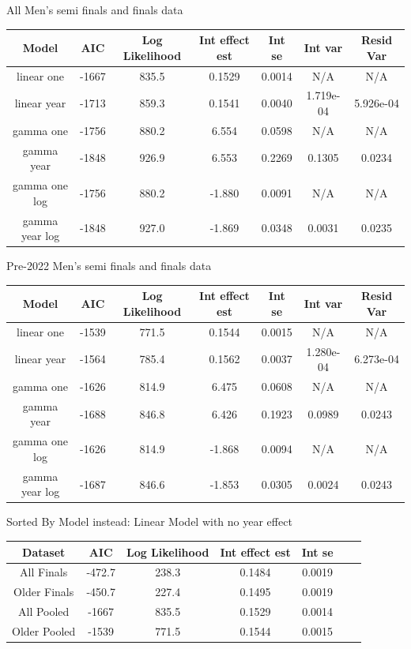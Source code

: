\documentclass[12pt, letterpaper, titlepage]{article}
\begin{document}
All Men's semi finals and finals data
\begin{center}
  \begin{tabular}{|c | c | c | c | c | c | c |} 
   \hline
   Model & AIC & Log Likelihood & Int effect est & Int se & Int var & Resid Var \\ [0.5ex] 
   \hline\hline
   linear one & -1667 & 835.5 & 0.1529 & 0.0014 & N/A & N/A \\
   \hline
   linear year & -1713 & 859.3 & 0.1541 & 0.0040 & 1.719e-04 & 5.926e-04 \\ 
   \hline
   gamma one & -1756 & 880.2 & 6.554 & 0.0598 & N/A & N/A \\
   \hline
   gamma year & -1848 & 926.9 & 6.553 & 0.2269 & 0.1305 & 0.0234 \\
   \hline
   gamma one log & -1756 & 880.2 & -1.880 & 0.0091 & N/A & N/A \\
   \hline
   gamma year log & -1848 & 927.0 & -1.869 & 0.0348 & 0.0031 & 0.0235 \\ [0.5ex]
   \hline
  \end{tabular}
  \end{center}

Pre-2022 Men's semi finals and finals data
\begin{center}
  \begin{tabular}{|c | c | c | c | c | c | c |} 
   \hline
   Model & AIC & Log Likelihood & Int effect est & Int se & Int var & Resid Var \\ [0.5ex] 
   \hline\hline
   linear one & -1539 & 771.5 & 0.1544 & 0.0015 & N/A & N/A \\
   \hline
   linear year & -1564 & 785.4 & 0.1562 & 0.0037 & 1.280e-04 & 6.273e-04 \\ 
   \hline
   gamma one & -1626 & 814.9 & 6.475 & 0.0608 & N/A & N/A \\
   \hline
   gamma year & -1688 & 846.8 & 6.426 & 0.1923 & 0.0989 & 0.0243 \\
   \hline
   gamma one log & -1626 & 814.9 & -1.868 & 0.0094 & N/A & N/A \\
   \hline
   gamma year log & -1687 & 846.6 & -1.853 & 0.0305 & 0.0024 & 0.0243 \\ [0.5ex]
   \hline
  \end{tabular}
  \end{center}



Sorted By Model instead:
Linear Model with no year effect
\begin{center}
  \begin{tabular}{|c | c | c | c | c | c | c |} 
   \hline
   Dataset & AIC & Log Likelihood & Int effect est & Int se \\ [0.5ex] 
   \hline\hline
   All Finals & -472.7 & 238.3 & 0.1484 & 0.0019 \\
   \hline
   Older Finals & -450.7 & 227.4 & 0.1495 & 0.0019 \\ 
   \hline
   All Pooled & -1667 & 835.5 & 0.1529 & 0.0014 \\
   \hline
   Older Pooled & -1539 & 771.5 & 0.1544 & 0.0015 \\
   \hline
  \end{tabular}
  \end{center}
\end{document}
